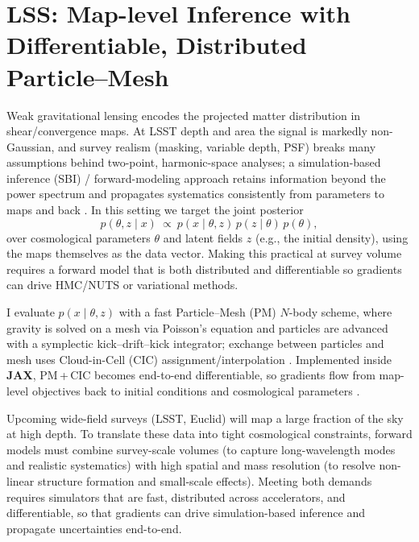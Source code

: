\documentclass{article}
\begin{document}
\newpage

\section*{LSS: Map-level Inference with Differentiable, Distributed Particle–Mesh}
Weak gravitational lensing encodes the projected matter distribution in shear/convergence maps. At LSST depth and area the signal is markedly non-Gaussian, and survey realism (masking, variable depth, PSF) breaks many assumptions behind two-point, harmonic-space analyses; a simulation-based inference (SBI) / forward-modeling approach retains information beyond the power spectrum and propagates systematics consistently from parameters to maps and back \citep{Cranmer2020SBI}. In this setting we target the joint posterior
\[
p(\theta, z \mid x)\ \propto\ p(x\mid \theta, z)\,p(z\mid \theta)\,p(\theta),
\]
over cosmological parameters \(\theta\) and latent fields \(z\) (e.g., the initial density), using the maps themselves as the data vector. Making this practical at survey volume requires a forward model that is both distributed and differentiable so gradients can drive HMC/NUTS or variational methods.

I evaluate \(p(x\mid\theta,z)\) with a fast Particle–Mesh (PM) \(N\)-body scheme, where gravity is solved on a mesh via Poisson’s equation and particles are advanced with a symplectic kick–drift–kick integrator; exchange between particles and mesh uses Cloud-in-Cell (CIC) assignment/interpolation \citep{HockneyEastwood1988}. Implemented inside \textbf{JAX}, PM\,+\,CIC becomes end-to-end differentiable, so gradients flow from map-level objectives back to initial conditions and cosmological parameters \citep{Bradbury2018JAX}.

Upcoming wide-field surveys (LSST, Euclid) will map a large fraction of the sky at high depth. To translate these data into tight cosmological constraints, forward models must combine survey-scale volumes (to capture long-wavelength modes and realistic systematics) with high spatial and mass resolution (to resolve non-linear structure formation and small-scale effects). Meeting both demands requires simulators that are fast, distributed across accelerators, and differentiable, so that gradients can drive simulation-based inference and propagate uncertainties end-to-end.
\end{document}

